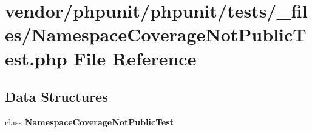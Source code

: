 \section{vendor/phpunit/phpunit/tests/\+\_\+files/\+Namespace\+Coverage\+Not\+Public\+Test.php File Reference}
\label{phpunit_2tests_2__files_2_namespace_coverage_not_public_test_8php}
\subsection*{Data Structures}
\begin{DoxyCompactItemize}
\item 
class {\bf Namespace\+Coverage\+Not\+Public\+Test}
\end{DoxyCompactItemize}
